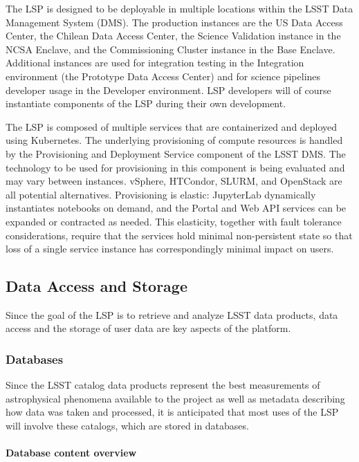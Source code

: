 The LSP is designed to be deployable in multiple locations within the LSST 
Data Management System (DMS).
The production instances are the US Data Access Center, the Chilean Data Access
Center, the Science Validation instance in the NCSA Enclave, and the
Commissioning Cluster instance in the Base Enclave.  
Additional instances are used for integration testing in the Integration
environment (the Prototype Data Access Center) and for science
pipelines developer usage in the Developer environment.
LSP developers will
of course instantiate components of the LSP during their own development.

The LSP is composed of multiple services that are containerized and deployed
using Kubernetes.  The underlying provisioning of compute resources is handled
by the Provisioning and Deployment Service component of the LSST DMS.  The
technology to be used for provisioning in this component is being evaluated and
may vary between instances.  vSphere, HTCondor, SLURM, and OpenStack are all
potential alternatives.  Provisioning is elastic: JupyterLab dynamically
instantiates notebooks on demand, and the Portal and Web API services can be
expanded or contracted as needed.
This elasticity, together with fault tolerance considerations, require that
the services hold minimal non-persistent state so
that loss of a single service instance has correspondingly minimal impact on
users.

\subsection{Data Access and Storage}\label{data-access-and-storage}

Since the goal of the LSP is to retrieve and analyze LSST data products,
data access and the storage of user data are key aspects of the platform.

\subsubsection{Databases}\label{databases}

Since the LSST catalog data products represent the best measurements of
astrophysical phenomena available to the project as well as metadata
describing how data was taken and processed, it is anticipated that
most uses of the LSP will involve these catalogs, which are stored in
databases.

\paragraph{Database content overview}\label{database-content-overview}

